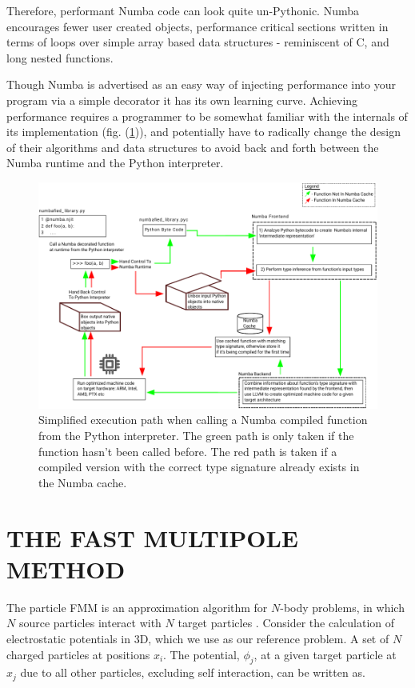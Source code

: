 \documentclass{IEEEcsmag}
\begin{document}
Therefore, performant Numba code can look quite un-Pythonic. Numba encourages fewer user created objects, performance critical sections written in terms of loops over simple array based data structures - reminiscent of C, and long nested functions. 

Though Numba is advertised as an easy way of injecting performance into your program via a simple decorator it has its own learning curve. Achieving performance requires a programmer to be somewhat familiar with the internals of its implementation (fig. (\ref{fig:numba})), and potentially have to radically change the design of their algorithms and data structures to avoid back and forth between the Numba runtime and the Python interpreter.

\begin{figure}
    \centerline{\includegraphics {figures/numba.pdf}}
    \caption{Simplified execution path when calling a Numba compiled function from the Python interpreter. The green path is only taken if the function hasn't been called before. The red path is taken if a compiled version with the correct type signature already exists in the Numba cache.}
    \label{fig:numba}
\end{figure}



\section{THE FAST MULTIPOLE METHOD}

The particle FMM is an approximation algorithm for $N$-body problems, in which $N$ source particles interact with $N$ target particles \cite{Greengard1987}. Consider the calculation of electrostatic potentials in 3D, which we use as our reference problem. A set of $N$ charged particles at positions $x_i$. The potential, $\phi_j$, at a given target particle at $x_j$ due to all other particles, excluding self interaction, can be written as.
\end{document}
